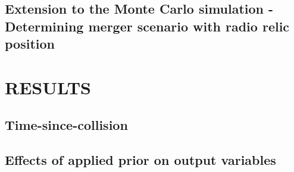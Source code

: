 \subsection{Extension to the Monte Carlo simulation - Determining merger scenario with radio relic position}
\label{sec: positionprior}



\section{RESULTS} 



\subsection{Time-since-collision}  



\subsection{Effects of applied prior on output variables}




